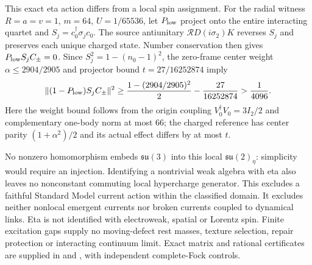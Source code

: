 This exact eta action differs from a local spin assignment.  For the
radial witness $R=a=v=1$, $m=64$, $U=1/65536$, let $P_{\rm low}$ project
onto the entire interacting quartet and $S_j=c_0^\dagger\sigma_jc_0$.
The source antiunitary $\mathcal R D(i\sigma_2)K$ reverses $S_j$ and
preserves each unique charged state.  Number conservation then gives
$P_{\rm low}S_jC_\pm=0$.  Since $S_j^2=1-(n_0-1)^2$, the zero-frame
center weight $\alpha\leq2904/2905$ and projector bound
$t=27/16252874$ imply
\begin{equation}
 \|(1-P_{\rm low})S_jC_\pm\|^2
 \geq\frac{1-(2904/2905)^2}{2}-\frac{27}{16252874}
 >\frac1{4096}.
 \label{eq:cdc-spin-leakage}
\end{equation}
Here the weight bound follows from the origin coupling
$V_0^\dagger V_0=3I_2/2$ and complementary one-body norm at most $66$;
the charged reference has center parity $(1+\alpha^2)/2$ and its actual
effect differs by at most $t$.

No nonzero homomorphism embeds $\mathfrak{su}(3)$ into this local
$\mathfrak{su}(2)_\eta$: simplicity would require an injection.
Identifying a nontrivial weak algebra with eta also leaves no nonconstant
commuting local hypercharge generator.  This excludes a faithful Standard
Model current action within the classified domain.  It excludes neither
nonlocal emergent currents nor broken currents coupled to dynamical links.
Eta is not identified with electroweak, spatial or Lorentz spin.
Finite excitation gaps supply no moving-defect rest masses, texture selection,
repair protection or interacting continuum limit.  Exact matrix and rational
certificates are supplied in  and
, with independent complete-Fock controls.
